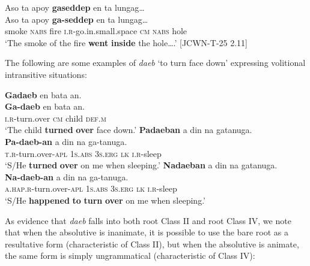 \ea
\label{bkm:Ref148965959}
Aso  ta  apoy  \textbf{gaseddep}  en  ta  lungag… \\\smallskip
\gll Aso  ta  apoy  \textbf{ga-seddep}  en  ta  lungag… \\
smoke  \textsc{nabs}  fire  \textsc{i.r}-go.in.small.space  \textsc{cm}  \textsc{nabs}  hole \\
\glt ‘The smoke of the fire \textbf{went} \textbf{inside} the hole….’ [JCWN-T-25 2.11]
\z

The following are some examples of \textit{daeb} ‘to turn face down’ expressing volitional intransitive situations:

\ea
\textbf{Gadaeb}  en  bata  an. \\\smallskip
\gll \textbf{Ga-daeb}  en  bata  an. \\
\textsc{i.r}-turn.over  \textsc{cm}  child  \textsc{def.m} \\
\glt ‘The child \textbf{turned} \textbf{over} face down.’
\z
\ea
\textbf{Padaeban}  a  din  na  gatanuga. \\\smallskip
\gll \textbf{Pa-daeb-an}  a  din  na  ga-tanuga. \\
\textsc{t.r}-turn.over-\textsc{apl}  1\textsc{s.abs}  3\textsc{s.erg}  \textsc{lk}  \textsc{i.r}-sleep \\
\glt ‘S/He \textbf{turned} \textbf{over} on me when sleeping.’
\z
\ea
\textbf{Nadaeban}  a  din  na  gatanuga. \\\smallskip
\gll \textbf{Na-daeb-an}  a  din  na  ga-tanuga. \\
\textsc{a.hap.r}-turn.over-\textsc{apl}  1\textsc{s.abs}  3\textsc{s.erg}  \textsc{lk}  \textsc{i.r}-sleep \\
\glt ‘S/He \textbf{happened} \textbf{to} \textbf{turn} \textbf{over} on me when sleeping.’
\z

As evidence that \textit{daeb} falls into both root Class II and root Class IV, we note that when the absolutive is inanimate, it is possible to use the bare root as a resultative form  (characteristic of Class II), but when the absolutive is animate, the same form is simply ungrammatical  (characteristic of Class IV):

\ea
    \z
\z

